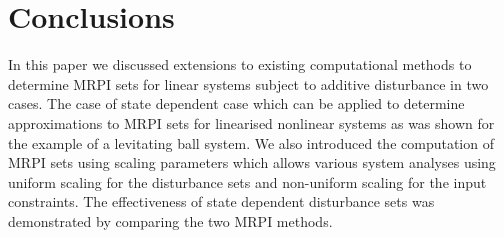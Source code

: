 \documentclass[letterpaper, 10pt, conference]{ieeeconf} %
\begin{document}
\section{Conclusions}\label{sec:conclusions}
%
In this paper we discussed extensions to existing computational methods to determine MRPI sets
for linear systems subject to additive disturbance in two cases. The case of state dependent case
which can be applied to determine approximations to MRPI sets for linearised nonlinear systems as was shown
for the example of a levitating ball system. We also introduced the computation of MRPI sets using 
scaling parameters which allows various system analyses using uniform scaling for the disturbance sets
and non-uniform scaling for the input constraints. The effectiveness of state dependent disturbance
sets was demonstrated by comparing the two MRPI methods.


%
\end{document}
